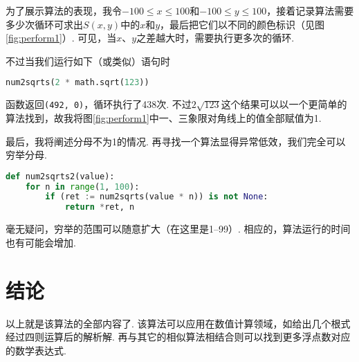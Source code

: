 \documentclass[a4paper, UTF8]{ctexart}
\begin{document}
为了展示算法的表现，我令$-100\leq x\leq100$和$-100\leq y\leq100$，接着记录算法需要多少次循环可求出$S(x,y)$中的$x$和$y$，最后把它们以不同的颜色标识（见图\ref{fig:perform1}）. 可见，当$x$、$y$之差越大时，需要执行更多次的循环.

不过当我们运行如下（或类似）语句时
\begin{lstlisting}[language=python]
num2sqrts(2 * math.sqrt(123))
\end{lstlisting}
函数返回\verb|(492, 0)|，循环执行了438次. 不过$2\sqrt{123}$这个结果可以以一个更简单的算法找到，故我将图\ref{fig:perform1}中一、三象限对角线上的值全部赋值为1.

最后，我将阐述分母不为1的情况. 再寻找一个算法显得异常低效，我们完全可以穷举分母.
\begin{lstlisting}[language=python, name=example2]
def num2sqrts2(value):
    for n in range(1, 100):
        if (ret := num2sqrts(value * n)) is not None:
            return *ret, n
\end{lstlisting}
毫无疑问，穷举的范围可以随意扩大（在这里是1--99）. 相应的，算法运行的时间也有可能会增加.

\section{结论}
以上就是该算法的全部内容了. 该算法可以应用在数值计算领域，如给出几个根式经过四则运算后的解析解. 再与其它的相似算法相结合则可以找到更多浮点数对应的数学表达式.
\end{document}

